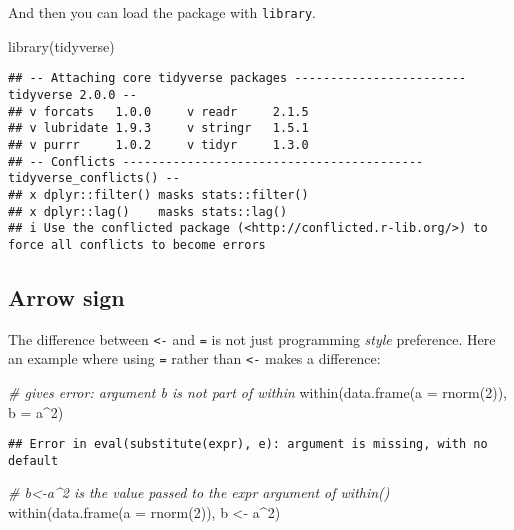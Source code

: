 \documentclass[
  oneside]{book}
\newenvironment{Shaded}{\begin{snugshade}}{\end{snugshade}}
\newcommand{\AttributeTok}[1]{\textcolor[rgb]{0.77,0.63,0.00}{#1}}
\newcommand{\CommentTok}[1]{\textcolor[rgb]{0.56,0.35,0.01}{\textit{#1}}}
\newcommand{\DecValTok}[1]{\textcolor[rgb]{0.00,0.00,0.81}{#1}}
\newcommand{\FunctionTok}[1]{\textcolor[rgb]{0.00,0.00,0.00}{#1}}
\newcommand{\NormalTok}[1]{#1}
\newcommand{\OtherTok}[1]{\textcolor[rgb]{0.56,0.35,0.01}{#1}}
\newcommand{\SpecialCharTok}[1]{\textcolor[rgb]{0.00,0.00,0.00}{#1}}
\begin{document}
And then you can load the package with \texttt{library}.

\begin{Shaded}
\begin{Highlighting}[]
\FunctionTok{library}\NormalTok{(tidyverse)}
\end{Highlighting}
\end{Shaded}

\begin{verbatim}
## -- Attaching core tidyverse packages ------------------------ tidyverse 2.0.0 --
## v forcats   1.0.0     v readr     2.1.5
## v lubridate 1.9.3     v stringr   1.5.1
## v purrr     1.0.2     v tidyr     1.3.0
## -- Conflicts ------------------------------------------ tidyverse_conflicts() --
## x dplyr::filter() masks stats::filter()
## x dplyr::lag()    masks stats::lag()
## i Use the conflicted package (<http://conflicted.r-lib.org/>) to force all conflicts to become errors
\end{verbatim}

\hypertarget{arrow-sign}{%
\subsection{Arrow sign}\label{arrow-sign}}

The difference between \texttt{\textless{}-} and \texttt{=} is not just programming \emph{style} preference.
Here an example where using \texttt{=} rather than \texttt{\textless{}-} makes a difference:

\begin{Shaded}
\begin{Highlighting}[]
\CommentTok{\# gives error: argument \textquotesingle{}b\textquotesingle{} is not part of \textquotesingle{}within\textquotesingle{}}
\FunctionTok{within}\NormalTok{(}\FunctionTok{data.frame}\NormalTok{(}\AttributeTok{a =} \FunctionTok{rnorm}\NormalTok{(}\DecValTok{2}\NormalTok{)), }\AttributeTok{b =}\NormalTok{ a}\SpecialCharTok{\^{}}\DecValTok{2}\NormalTok{)}
\end{Highlighting}
\end{Shaded}

\begin{verbatim}
## Error in eval(substitute(expr), e): argument is missing, with no default
\end{verbatim}

\begin{Shaded}
\begin{Highlighting}[]
\CommentTok{\# \textquotesingle{}b\textless{}{-}a\^{}2\textquotesingle{} is the value passed to the expr argument of within()}
\FunctionTok{within}\NormalTok{(}\FunctionTok{data.frame}\NormalTok{(}\AttributeTok{a =} \FunctionTok{rnorm}\NormalTok{(}\DecValTok{2}\NormalTok{)), b }\OtherTok{\textless{}{-}}\NormalTok{ a}\SpecialCharTok{\^{}}\DecValTok{2}\NormalTok{)}
\end{Highlighting}
\end{Shaded}
\end{document}
